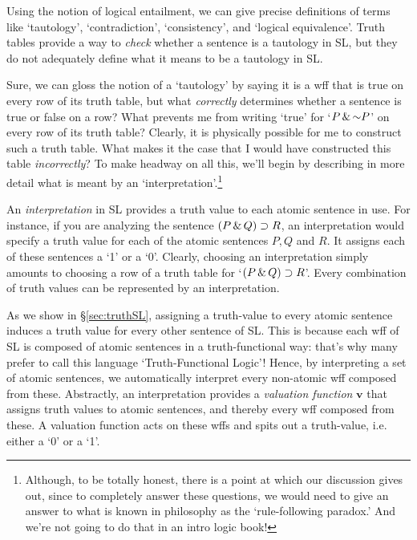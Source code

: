 Using the notion of logical entailment, we can give precise definitions of terms like `tautology', `contradiction', `consistency', and `logical equivalence'. Truth tables provide a way to \emph{check} whether a sentence is a tautology in SL, but they do not adequately define what it means to be a tautology in SL. {\color{black}Sure, we can gloss the notion of a `tautology' by saying it is a wff that is true on every row of its truth table, but what \textit{correctly} determines whether a sentence is true or false on a row? What prevents me from writing `true' for `$P\eand \enot P$' on every row of its truth table? Clearly, it is physically possible for me to construct such a truth table. What makes it the case that I would have constructed this table \textit{incorrectly}? To make headway on all this, we'll begin by describing in more detail what is meant by an `interpretation'.\footnote{{\color{black}Although, to be totally honest, there is a point at which our discussion gives out, since to completely answer these questions, we would need to give an answer to what is known in philosophy as the `rule-following paradox.' And we're not going to do that in an intro logic book!}} 


An \emph{interpretation} in SL provides a truth value to each atomic sentence in use. For instance, if you are analyzing the sentence $(P \,\&\, Q) \supset R$, an interpretation would specify a truth value for each of the atomic sentences $P, Q$ and $R$. It assigns each of these sentences a `1' or a `0'. Clearly, choosing an interpretation simply amounts to choosing a row of a truth table for `$(P \,\&\, Q) \supset R$'. Every combination of truth values can be represented by an interpretation. 

As we show in \S\ref{sec:truthSL}, assigning a truth-value to every atomic sentence induces a truth value for every other sentence of SL. This is because each wff of SL is composed of atomic sentences in a truth-functional way: that's why many prefer to call this language `Truth-Functional Logic'! Hence, by interpreting a set of atomic sentences, we automatically interpret every non-atomic wff composed from these. Abstractly, an interpretation provides a \textit{valuation function} $\mathbf{v}$ that assigns truth values to atomic sentences, and thereby every wff composed from these. A valuation function acts on these wffs and spits out a truth-value, i.e. either a `0' or a `1'. 

}
